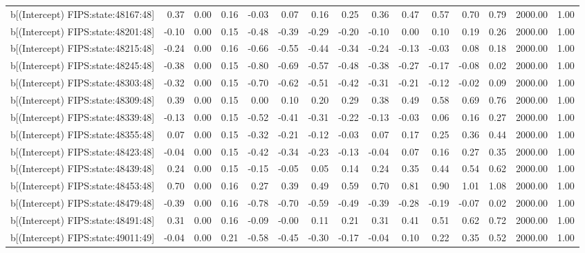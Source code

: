 \begin{table}[ht]
\begin{tabular}{rrrrrrrrrrrrrrr}
  b[(Intercept) FIPS:state:48167:48] & 0.37 & 0.00 & 0.16 & -0.03 & 0.07 & 0.16 & 0.25 & 0.36 & 0.47 & 0.57 & 0.70 & 0.79 & 2000.00 & 1.00 \\ 
  b[(Intercept) FIPS:state:48201:48] & -0.10 & 0.00 & 0.15 & -0.48 & -0.39 & -0.29 & -0.20 & -0.10 & 0.00 & 0.10 & 0.19 & 0.26 & 2000.00 & 1.00 \\ 
  b[(Intercept) FIPS:state:48215:48] & -0.24 & 0.00 & 0.16 & -0.66 & -0.55 & -0.44 & -0.34 & -0.24 & -0.13 & -0.03 & 0.08 & 0.18 & 2000.00 & 1.00 \\ 
  b[(Intercept) FIPS:state:48245:48] & -0.38 & 0.00 & 0.15 & -0.80 & -0.69 & -0.57 & -0.48 & -0.38 & -0.27 & -0.17 & -0.08 & 0.02 & 2000.00 & 1.00 \\ 
  b[(Intercept) FIPS:state:48303:48] & -0.32 & 0.00 & 0.15 & -0.70 & -0.62 & -0.51 & -0.42 & -0.31 & -0.21 & -0.12 & -0.02 & 0.09 & 2000.00 & 1.00 \\ 
  b[(Intercept) FIPS:state:48309:48] & 0.39 & 0.00 & 0.15 & 0.00 & 0.10 & 0.20 & 0.29 & 0.38 & 0.49 & 0.58 & 0.69 & 0.76 & 2000.00 & 1.00 \\ 
  b[(Intercept) FIPS:state:48339:48] & -0.13 & 0.00 & 0.15 & -0.52 & -0.41 & -0.31 & -0.22 & -0.13 & -0.03 & 0.06 & 0.16 & 0.27 & 2000.00 & 1.00 \\ 
  b[(Intercept) FIPS:state:48355:48] & 0.07 & 0.00 & 0.15 & -0.32 & -0.21 & -0.12 & -0.03 & 0.07 & 0.17 & 0.25 & 0.36 & 0.44 & 2000.00 & 1.00 \\ 
  b[(Intercept) FIPS:state:48423:48] & -0.04 & 0.00 & 0.15 & -0.42 & -0.34 & -0.23 & -0.13 & -0.04 & 0.07 & 0.16 & 0.27 & 0.35 & 2000.00 & 1.00 \\ 
  b[(Intercept) FIPS:state:48439:48] & 0.24 & 0.00 & 0.15 & -0.15 & -0.05 & 0.05 & 0.14 & 0.24 & 0.35 & 0.44 & 0.54 & 0.62 & 2000.00 & 1.00 \\ 
  b[(Intercept) FIPS:state:48453:48] & 0.70 & 0.00 & 0.16 & 0.27 & 0.39 & 0.49 & 0.59 & 0.70 & 0.81 & 0.90 & 1.01 & 1.08 & 2000.00 & 1.00 \\ 
  b[(Intercept) FIPS:state:48479:48] & -0.39 & 0.00 & 0.16 & -0.78 & -0.70 & -0.59 & -0.49 & -0.39 & -0.28 & -0.19 & -0.07 & 0.02 & 2000.00 & 1.00 \\ 
  b[(Intercept) FIPS:state:48491:48] & 0.31 & 0.00 & 0.16 & -0.09 & -0.00 & 0.11 & 0.21 & 0.31 & 0.41 & 0.51 & 0.62 & 0.72 & 2000.00 & 1.00 \\ 
  b[(Intercept) FIPS:state:49011:49] & -0.04 & 0.00 & 0.21 & -0.58 & -0.45 & -0.30 & -0.17 & -0.04 & 0.10 & 0.22 & 0.35 & 0.52 & 2000.00 & 1.00 \\ 

\end{tabular}
\end{table}
